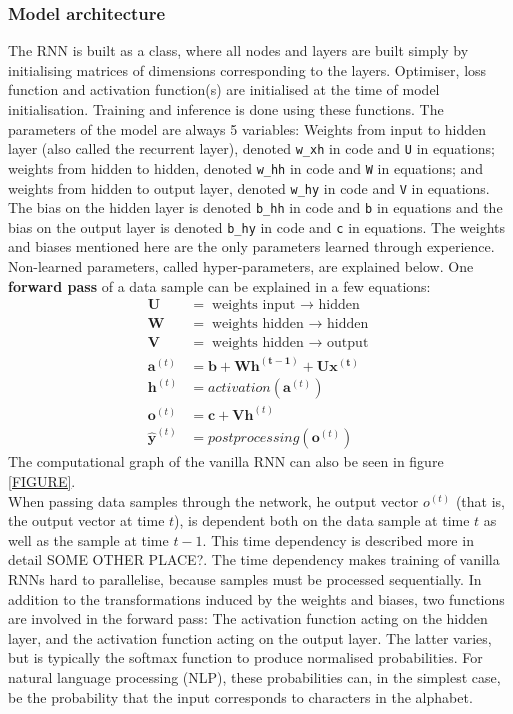 \documentclass[12pt]{article}
\begin{document}
\subsubsection*{Model architecture}
The RNN is built as a class, where all nodes and layers are built simply by initialising matrices of dimensions corresponding to the layers. Optimiser, loss function and activation function(s) are initialised at the time of model initialisation. Training and inference is done using these functions. The parameters of the model are always 5 variables: Weights from input to hidden layer (also called the recurrent layer), denoted \texttt{w\_xh} in code and \texttt{U} in equations; weights from hidden to hidden, denoted \texttt{w\_hh} in code and \texttt{W} in equations; and weights from hidden to output layer, denoted \texttt{w\_hy} in code and \texttt{V} in equations. The bias on the hidden layer is denoted \texttt{b\_hh} in code and \texttt{b} in equations and the bias on the output layer is denoted \texttt{b\_hy} in code and \texttt{c} in equations. The weights and biases mentioned here are the only parameters learned through experience. Non-learned parameters, called hyper-parameters, are explained below. One \textbf{forward pass} of a data sample can be explained in a few equations:
\begin{align}
    \mathbf{U} &= \text{weights input $\rightarrow$ hidden} \\
    \mathbf{W} &= \text{weights hidden $\rightarrow$ hidden} \\
    \mathbf{V} &= \text{weights hidden $\rightarrow$ output} \\
    \mathbf{a}^{(t)} &= \mathbf{b + Wh^{(t-1)} + Ux^{(t)}} \\
    \mathbf{h}^{(t)} &= activation(\mathbf{a}^{(t)})\\
    \mathbf{o}^{(t)} &= \mathbf{c + Vh}^{(t)} \\
    \mathbf{\hat{y}}^{(t)} &= postprocessing(\mathbf{o}^{(t)})
\end{align}
The computational graph of the vanilla RNN can also be seen in figure \cref{FIGURE}. \\
When passing data samples through the network, he output vector $o^{(t)}$ (that is, the output vector at time $t$), is dependent both on the data sample at time $t$ as well as the sample at time $t-1$. This time dependency is described more in detail SOME OTHER PLACE?. The time dependency makes training of vanilla RNNs hard to parallelise, because samples must be processed sequentially. In addition to the transformations induced by the weights and biases, two functions are involved in the forward pass: The activation function acting on the hidden layer, and the activation function acting on the output layer. The latter varies, but is typically the softmax function to produce normalised probabilities. For natural language processing (NLP), these probabilities can, in the simplest case, be the probability that the input corresponds to characters in the alphabet.
\end{document}
